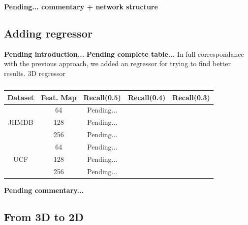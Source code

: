 \textbf{Pending... commentary + network structure}

\subsection{Adding regressor}
\textbf{Pending introduction...}
\textbf{Pending complete table...}
In full correspondance with the previous approach, we added an regressor for trying to find better results.
3D regressor

\begin{table}[h]
  \centering
  \begin{tabular}{||c | c || c  c  c||}
    \hline
    \textbf{Dataset} & \textbf{Feat. Map} & \textbf{Recall(0.5)} & \textbf{Recall(0.4)} & \textbf{Recall(0.3)}\\
    \hline
    \multirow{3}{*}{JHMDB} &  64 & Pending... \\
    \cline{2-5}
    {} & 128 & Pending... \\
    \cline{2-5}
    {} & 256 & Pending... \\
    \hline
    \multirow{3}{*}{UCF}  & 64 & Pending...\\
    \cline{2-5}
    {} & 128 & Pending...\\
    \cline{2-5}
    {} & 256 & Pending... \\
    \hline

  \end{tabular}
  \caption{}
  \label{table:reg_2_1}
\end{table}

\textbf{Pending commentary...}

\subsection{From 3D to 2D}

